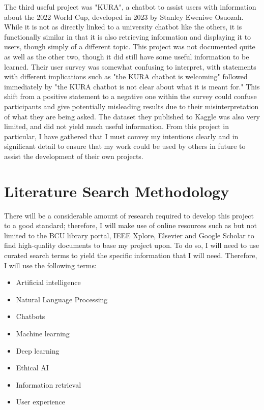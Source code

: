 \documentclass[12pt]{report}
\begin{document}
    \noindent The third useful project was "KURA", a chatbot to assist users with information about the 2022 World
    Cup, developed in 2023 by Stanley Eweniwe Osuozah. While it is not as directly linked to a university chatbot 
    like the others, it is functionally similar in that it is also retrieving information and displaying it to users,
    though simply of a different topic. This project was not documented quite as well as the other
    two, though it did still have some useful information to be learned. Their user survey was somewhat confusing to 
    interpret, with statements with different implications such as "the KURA chatbot is welcoming" followed immediately
    by "the KURA chatbot is not clear about what it is meant for." This shift from a positive statement to a negative one
    within the survey could confuse participants and give potentially misleading results due to their misinterpretation
    of what they are being asked. The dataset they published to Kaggle was also very limited, and did not yield
    much useful information. From this project in particular, I have gathered that I must convey my intentions 
    clearly and in significant detail to ensure that my work could be used by others in future to assist the 
    development of their own projects.
    
    \section{Literature Search Methodology}
    There will be a considerable amount of research required to develop this project to a good standard; therefore,
    I will make use of online resources such as but not limited to the BCU library portal, IEEE Xplore, Elsevier
    and Google Scholar to find high-quality documents to base my project upon. To do so, I will need to use 
    curated search terms to yield the specific information that I will need. Therefore,
    I will use the following terms:

    \begin{itemize}
        \item Artificial intelligence
        \item Natural Language Processing
        \item Chatbots 
        \item Machine learning
        \item Deep learning
        \item Ethical AI
        \item Information retrieval
        \item User experience
    \end{itemize}
\end{document}
